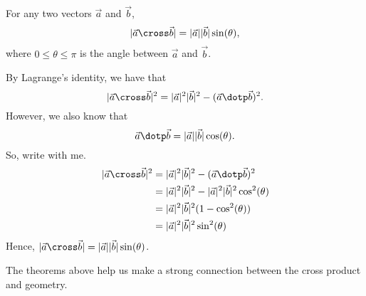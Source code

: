 \documentclass{ximera}
\begin{document}
\begin{theorem}
  For any two vectors $\vec{a}$ and $\vec{b}$,
  \[
  |\vec{a} \cross \vec{b}| = |\vec{a}||\vec{b}|\sin(\theta),
  \]
  where $0\le \theta\le\pi$ is the angle between $\vec{a}$ and
  $\vec{b}$.
  \begin{explanation}
    By Lagrange's identity, we have that
    \[
    |\vec{a}\cross\vec{b}|^2 = |\vec{a}|^2 |\vec{b}|^2 - (\vec{a}\dotp\vec{b})^2.
    \]
    However, we also know that
    \[
    \vec{a} \dotp\vec{b} = |\vec{a}| |\vec{b}|\cos(\theta).
    \]
    So, write with me.
    \begin{align*}
      |\vec{a}\cross\vec{b}|^2 &= |\vec{a}|^2 |\vec{b}|^2 - (\vec{a}\dotp\vec{b})^2\\
      &= |\vec{a}|^2 |\vec{b}|^2 - |\vec{a}|^2 |\vec{b}|^2\cos^2(\theta)\\
      &= |\vec{a}|^2 |\vec{b}|^2(1 - \cos^2(\theta))\\
      &= |\vec{a}|^2 |\vec{b}|^2\sin^2(\theta)
    \end{align*}
    Hence, $|\vec{a} \cross \vec{b}| = |\vec{a}||\vec{b}|\sin(\theta)$.
  \end{explanation}
\end{theorem}

The theorems above help us make a strong connection between the cross
product and geometry.
\end{document}
